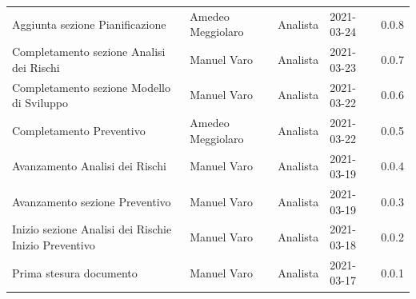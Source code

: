 \documentclass[a4paper]{article}
\begin{document}
\begin{center}
\begin{table}[h!]
\begin{tabular}{p{150px} p{90px} p{80px} p{60px} p{45px}}
            Aggiunta sezione Pianificazione                               & Amedeo Meggiolaro & Analista       & 2021-03-24    & 0.0.8             \\
            Completamento sezione Analisi dei Rischi                      & Manuel Varo       & Analista       & 2021-03-23    & 0.0.7             \\
            Completamento sezione Modello di Sviluppo                     & Manuel Varo       & Analista       & 2021-03-22    & 0.0.6             \\
            Completamento Preventivo                                      & Amedeo Meggiolaro & Analista       & 2021-03-22    & 0.0.5             \\
            Avanzamento Analisi dei Rischi                                & Manuel Varo       & Analista       & 2021-03-19    & 0.0.4             \\
            Avanzamento sezione Preventivo                                & Manuel Varo       & Analista       & 2021-03-19    & 0.0.3             \\
            Inizio sezione Analisi dei Rischi\newline e Inizio Preventivo & Manuel Varo       & Analista       & 2021-03-18    & 0.0.2             \\
            Prima stesura documento                                       & Manuel Varo       & Analista       & 2021-03-17    & 0.0.1             \\
        \end{tabular}
    \end{table}
\end{center}

\newpage
\tableofcontents
\newpage
\newpage
\listoffigures
\newpage
\newpage
\listoftables
\newpage






\appendix


\end{document}
